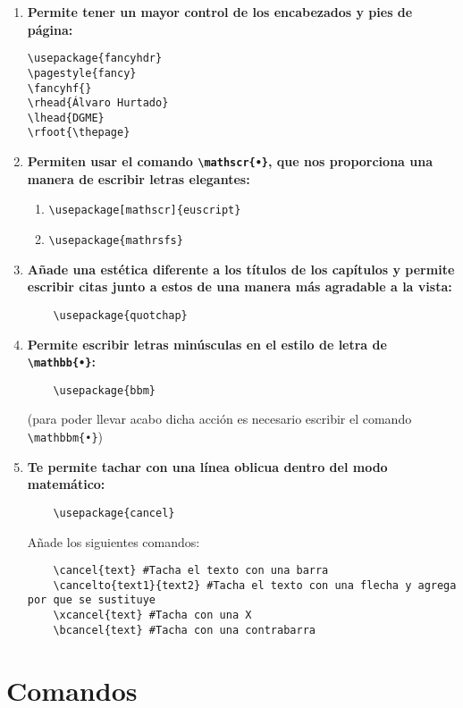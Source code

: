 \documentclass[11pt,a4paper]{article}
\begin{document}
\begin{enumerate}
\item \textbf{Permite tener un mayor control de los encabezados y pies de página:}
\begin{verbatim}
\usepackage{fancyhdr}
\pagestyle{fancy}
\fancyhf{}
\rhead{Álvaro Hurtado}
\lhead{DGME}
\rfoot{\thepage}
\end{verbatim}

\item \cprotect \textbf{Permiten usar el comando \verb|\mathscr{•}|, que nos proporciona una manera de escribir letras elegantes:}
\begin{enumerate}
	\item \verb|\usepackage[mathscr]{euscript}|
	\item \verb|\usepackage{mathrsfs}|
\end{enumerate}

\item \textbf{Añade una estética diferente a los títulos de los capítulos y permite escribir citas junto a estos de una manera más agradable a la vista:}
\begin{verbatim}
	\usepackage{quotchap}
\end{verbatim}

\item \cprotect \textbf{Permite escribir letras minúsculas en el estilo de letra de \verb|\mathbb{•}|:}
\begin{verbatim}
	\usepackage{bbm}
\end{verbatim}
(para poder llevar acabo dicha acción es necesario escribir el comando \verb|\mathbbm{•}|)

\item \textbf{Te permite tachar con una línea oblicua dentro del modo matemático:}
\begin{verbatim}
	\usepackage{cancel}
\end{verbatim}
Añade los siguientes comandos:
\begin{verbatim}
	\cancel{text} #Tacha el texto con una barra
	\cancelto{text1}{text2} #Tacha el texto con una flecha y agrega por que se sustituye
	\xcancel{text} #Tacha con una X
	\bcancel{text} #Tacha con una contrabarra
\end{verbatim}

\end{enumerate}

\section{Comandos}
\end{document}
